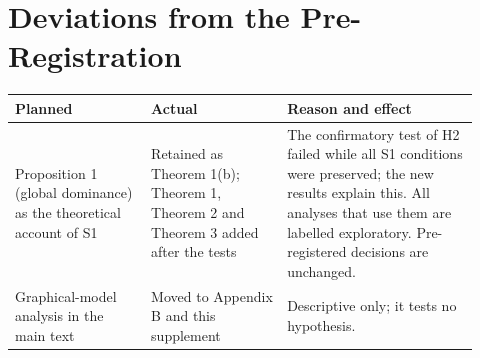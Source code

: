 \documentclass[journal,onecolumn,11pt]{IEEEtran}
\begin{document}
\section{Deviations from the Pre-Registration}
\begin{table}[h]\centering\small
\begin{tabular}{@{}p{0.27\linewidth}p{0.27\linewidth}p{0.38\linewidth}@{}}\toprule
Planned & Actual & Reason and effect\\\midrule
Proposition 1 (global dominance) as the theoretical account of S1 & Retained as Theorem 1(b); Theorem 1, Theorem 2 and Theorem 3 added after the tests & The confirmatory test of H2 failed while all S1 conditions were preserved; the new results explain this. All analyses that use them are labelled exploratory. Pre-registered decisions are unchanged.\\
Graphical-model analysis in the main text & Moved to Appendix B and this supplement & Descriptive only; it tests no hypothesis.\\\bottomrule
\end{tabular}
\end{table}
\end{document}
